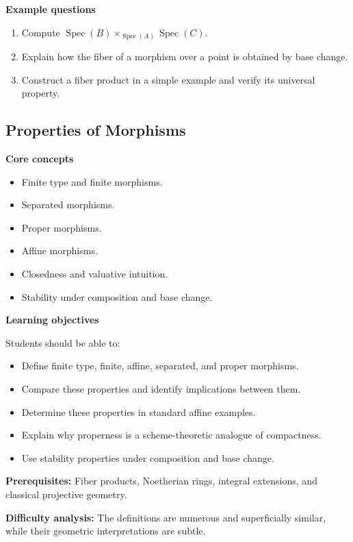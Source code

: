 \documentclass[11pt]{article}
\begin{document}
\textbf{Example questions}
\begin{enumerate}
    \item Compute $\operatorname{Spec}(B)\times_{\operatorname{Spec}(A)}\operatorname{Spec}(C)$.
    \item Explain how the fiber of a morphism over a point is obtained by base change.
    \item Construct a fiber product in a simple example and verify its universal property.
\end{enumerate}

\subsection{Properties of Morphisms}

\textbf{Core concepts}
\begin{itemize}
    \item Finite type and finite morphisms.
    \item Separated morphisms.
    \item Proper morphisms.
    \item Affine morphisms.
    \item Closedness and valuative intuition.
    \item Stability under composition and base change.
\end{itemize}

\textbf{Learning objectives}

Students should be able to:
\begin{itemize}
    \item Define finite type, finite, affine, separated, and proper morphisms.
    \item Compare these properties and identify implications between them.
    \item Determine these properties in standard affine examples.
    \item Explain why properness is a scheme-theoretic analogue of compactness.
    \item Use stability properties under composition and base change.
\end{itemize}

\textbf{Prerequisites:} Fiber products, Noetherian rings, integral extensions, and classical projective geometry.

\textbf{Difficulty analysis:} The definitions are numerous and superficially similar, while their geometric interpretations are subtle.
\end{document}
